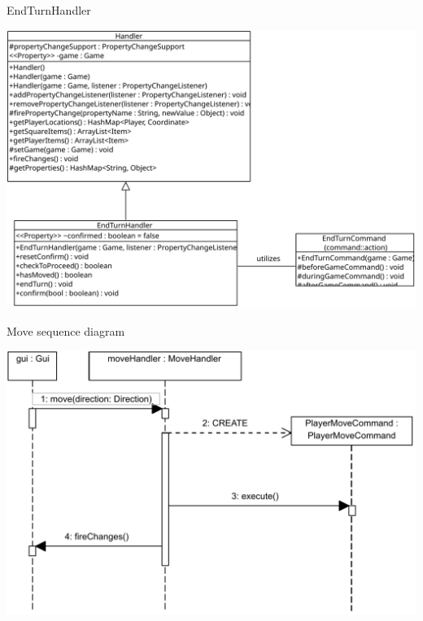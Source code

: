 \documentclass[11pt,t]{beamer}
\begin{document}
\begin{frame}{EndTurnHandler}
\begin{center}
\includegraphics[scale=0.45]{images/endturnhandler}
\end{center}
\end{frame}

\begin{frame}{Move sequence diagram}
\begin{center}
\includegraphics[scale=0.45]{images/movehandlerseq}
\end{center}
\end{frame}
\end{document}
